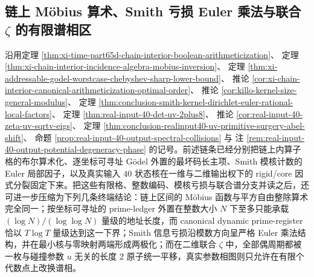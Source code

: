 \subsection{链上 Möbius 算术、Smith 亏损 Euler 乘法与联合 \texorpdfstring{$\zeta$}{zeta} 的有限谱相区}\label{subsec:conclusion-chain-godel-smith-jointzeta-finite-phase}

沿用定理 \ref{thm:xi-time-part65d-chain-interior-boolean-arithmeticization}、
定理 \ref{thm:xi-chain-interior-incidence-algebra-mobius-inversion}、
定理 \ref{thm:xi-addressable-godel-worstcase-chebyshev-sharp-lower-bound}、
推论 \ref{cor:xi-chain-interior-canonical-arithmeticization-optimal-order}、
推论 \ref{cor:killo-kernel-size-general-modulus}、
定理 \ref{thm:conclusion-smith-kernel-dirichlet-euler-rational-local-factors}、
定理 \ref{thm:real-input-40-det-uv-2plus8}、
推论 \ref{cor:real-input-40-zeta-uv-sqrtv-eigs}、
定理 \ref{thm:conclusion-realinput40-uv-primitive-surgery-abel-shift}、
命题 \ref{prop:real-input-40-output-spectral-collisions} 与
注 \ref{rem:real-input-40-output-potential-degeneracy-phase} 的记号。前述链条已经分别把链上内算子格的布尔算术化、逐坐标可寻址 Gödel 外置的最坏码长主项、Smith 模核计数的 Euler 局部因子，以及真实输入 \(40\) 状态核在一维与二维输出权下的 rigid/core 因式分裂固定下来。把这些有限格、整数编码、模核亏损与联合谱分支并读之后，还可进一步压缩为下列几条终端结论：链上区间的 Möbius 函数与平方自由整除算术完全同一；按坐标可寻址的 prime-ledger 外置在整数大小 \(N\) 下至多只能承载 \((\log N)/(\log\log N)\) 量级的地址长度，而 canonical dynamic prime-register 恰以 \(T\log T\) 量级达到这一下界；Smith 信息亏损沿模数方向呈严格 Euler 乘法结构，并在最小核与零映射两端形成两极化；而在二维联合 \(\zeta\) 中，全部偶周期都被一枚与碰撞参数 \(u\) 无关的长度 \(2\) 原子统一平移，真实参数相图则只允许在有限个代数点上改换谱相。

